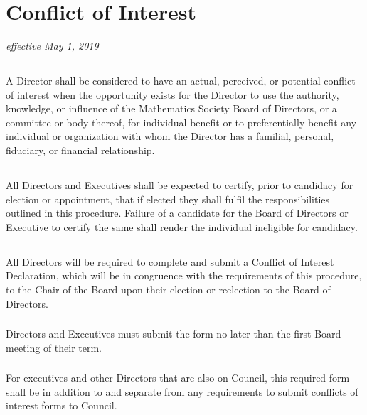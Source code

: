 \section{Conflict of Interest}
\emph{effective May 1, 2019}\\

\subsection{}
A Director shall be considered to have an actual, perceived, or potential conflict of interest when the opportunity exists for the Director to use the authority, knowledge, or influence of the Mathematics Society Board of Directors, or a committee or body thereof, for individual benefit or to preferentially benefit any individual or organization with whom the Director has a familial, personal, fiduciary, or financial relationship.

\subsection{}
All Directors and Executives shall be expected to certify, prior to candidacy for election or appointment, that if elected they shall fulfil the responsibilities outlined in this procedure. Failure of a candidate for the Board of Directors or Executive to certify the same shall render the individual ineligible for candidacy.

\subsection{}
All Directors will be required to complete and submit a Conflict of Interest Declaration, which will be in congruence with the requirements of this procedure, to the Chair of the Board upon their election or reelection to the Board of Directors. 

\subsubsection{}
Directors and Executives must submit the form no later than the first Board meeting of their term.

\subsubsection{}
For executives and other Directors that are also on Council, this required form shall be in addition to and separate from any requirements to submit conflicts of interest forms to Council.

